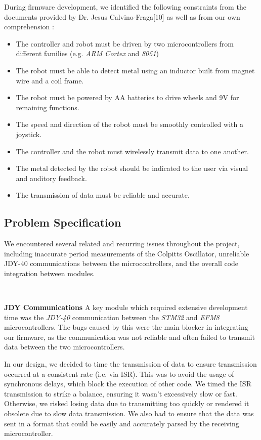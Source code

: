 \documentclass{article}
\begin{document}
During firmware development, we identified the following constraints from the
documents provided by Dr. Jesus Calvino-Fraga[10] as well as from our own comprehension : \\
\begin{itemize}
  \item The controller and robot must be driven by two microcontrollers from different families (e.g. \textit{ARM Cortex} and \textit{8051})
  \item The robot must be able to detect metal using an inductor built from magnet wire and a coil frame.
  \item The robot must be powered by AA batteries to drive wheels and 9V for remaining functions.
  \item The speed and direction of the robot must be smoothly controlled with a joystick.
  \item The controller and the robot must wirelessly transmit data to one another.
  \item The metal detected by the robot should be indicated to the user via visual and auditory feedback.
  \item The transmission of data must be reliable and accurate.
\end{itemize}

\subsection{Problem Specification}

We encountered several related and recurring issues throughout the project, including inaccurate period measurements of the
Colpitts Oscillator, unreliable JDY-40 communications between the microcontrollers, and
the overall code integration between modules.

\

\textbf{JDY Communications}
A key module which required extensive development time was the \textit{JDY-40} communication between the \textit{STM32} and \textit{EFM8} microcontrollers.
The bugs caused by this were the main blocker in integrating our firmware, as the communication was not reliable and often failed to transmit
data between the two microcontrollers.

In our design, we decided to time the transmission of data to ensure transmission occurred at a consistent rate (i.e. via ISR).
This was to avoid the usage of synchronous delays, which block the execution of other code. We timed the ISR transmission to strike a balance,
ensuring it wasn't excessively slow or fast. Otherwise, we risked losing data due to transmitting too quickly or rendered it obsolete
due to slow data transmission. We also had to ensure that the data was sent in a format that could be easily and accurately parsed by the
receiving microcontroller.
\end{document}
